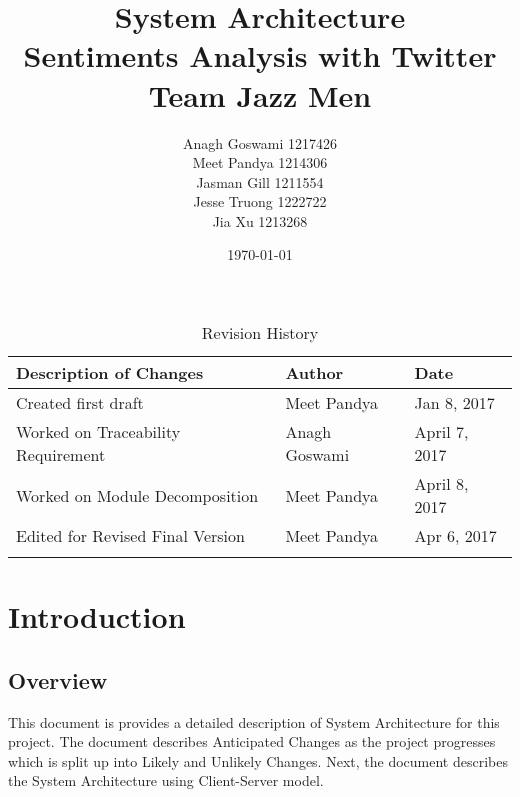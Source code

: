 \documentclass[12pt, titlepage]{article}
\begin{document}
\title{System Architecture \\ Sentiments Analysis with Twitter \\ Team Jazz Men}
\author{Anagh Goswami 1217426 \\ Meet Pandya 1214306 \\ Jasman Gill  1211554 \\ Jesse Truong  1222722 \\ Jia Xu  1213268 \\}
\date{\today}
	
\maketitle

\tableofcontents
\listoftables
\listoffigures

\newpage

\begin{table}[h]
\centering
\caption{Revision History}
\begin{tabular}{|l|l|l|}
\Xhline{2\arrayrulewidth}
\bf Description of Changes & \bf Author & \bf Date\\\hline
Created first draft& Meet Pandya& Jan 8, 2017\\\midrule
Worked on Traceability Requirement& Anagh Goswami& April 7, 2017\\\bottomrule
Worked on Module Decomposition& Meet Pandya& April 8, 2017\\\bottomrule
Edited for Revised Final Version& Meet Pandya & Apr 6, 2017\\\bottomrule

\Xhline{2\arrayrulewidth}
\end{tabular}
\end{table}




\section{Introduction}
\subsection{Overview}
This document is provides a detailed description of System Architecture for this project. The document describes Anticipated Changes as the project progresses which is split up into Likely and Unlikely Changes. Next, the document describes the System Architecture using Client-Server model.
\end{document}
